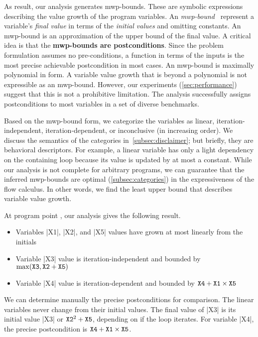 As result, our analysis generates {mwp-bounds}.
These are symbolic expressions describing the value growth of the program variables.
An \emph{mwp-bound}~\cite{jones2009} represent a variable's \emph{final value} in terms of the \emph{initial values} and omitting constants.
An mwp-bound is an approximation of the {upper bound} of the final value.
A critical idea is that the \textbf{mwp-bounds are postconditions}.
Since the problem formulation assumes no pre-conditions, a function in terms of the inputs is the most precise achievable postcondition in most cases.
An mwp-bound is maximally polynomial in form.
A variable value growth that is beyond a polynomial is not expressible as an mwp-bound.
However, our experiments (\autoref{sec:performance}) suggest that this is not a prohibitive limitation.
The analysis successfully assigns postconditions to most variables in a set of diverse benchmarks.

Based on the mwp-bound form, we categorize the variables as linear, iteration-independent, iteration-dependent, or inconclusive (in increasing order).
We discuss the semantics of the categories in~\autoref{subsec:disclaimer};
but briefly, they are behavioral descriptors.
For example, a linear variable has only a light dependency on the containing loop because its value is updated by at most a constant.
While our analysis is not complete for arbitrary programs, we can guarantee that the inferred mwp-bounds are {optimal} (\autoref{subsec:categories}) \wrt in the expressiveness of the flow calculus.
In other words, we find the least upper bound that describes variable value growth.

At program point \qtext, our analysis gives the following result.
\begin{itemize}
\item Variables \pr|X1|, \pr|X2|, and \pr|X5| values have grown at most linearly from the initials
\item Variable  \pr|X3| value is iteration-independent and bounded by \(\max(\prm{X3},\prm{X2}+\prm{X5})\)
\item Variable  \pr|X4| value is iteration-dependent and bounded by \(\prm{X4}+\prm{X1}\times\prm{X5}\)
\end{itemize}

We can determine manually the precise postconditions for comparison.
The linear variables never change from their initial values.
The final value of \pr|X3| is its initial value \pr|X3| or \(\prm{X2}^2+\prm{X5}\), depending on if the loop iterates.
For variable \pr|X4|, the precise postcondition is \(\prm{X4}+\prm{X1}\times\prm{X5}\).

